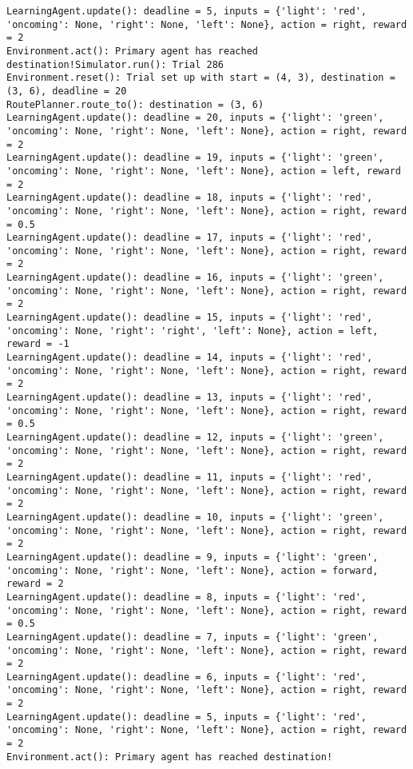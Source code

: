 \documentclass{article}
\begin{document}
\begin{verbatim}
LearningAgent.update(): deadline = 5, inputs = {'light': 'red', 'oncoming': None, 'right': None, 'left': None}, action = right, reward = 2
Environment.act(): Primary agent has reached destination!Simulator.run(): Trial 286
Environment.reset(): Trial set up with start = (4, 3), destination = (3, 6), deadline = 20
RoutePlanner.route_to(): destination = (3, 6)
LearningAgent.update(): deadline = 20, inputs = {'light': 'green', 'oncoming': None, 'right': None, 'left': None}, action = right, reward = 2
LearningAgent.update(): deadline = 19, inputs = {'light': 'green', 'oncoming': None, 'right': None, 'left': None}, action = left, reward = 2
LearningAgent.update(): deadline = 18, inputs = {'light': 'red', 'oncoming': None, 'right': None, 'left': None}, action = right, reward = 0.5
LearningAgent.update(): deadline = 17, inputs = {'light': 'red', 'oncoming': None, 'right': None, 'left': None}, action = right, reward = 2
LearningAgent.update(): deadline = 16, inputs = {'light': 'green', 'oncoming': None, 'right': None, 'left': None}, action = right, reward = 2
LearningAgent.update(): deadline = 15, inputs = {'light': 'red', 'oncoming': None, 'right': 'right', 'left': None}, action = left, reward = -1
LearningAgent.update(): deadline = 14, inputs = {'light': 'red', 'oncoming': None, 'right': None, 'left': None}, action = right, reward = 2
LearningAgent.update(): deadline = 13, inputs = {'light': 'red', 'oncoming': None, 'right': None, 'left': None}, action = right, reward = 0.5
LearningAgent.update(): deadline = 12, inputs = {'light': 'green', 'oncoming': None, 'right': None, 'left': None}, action = right, reward = 2
LearningAgent.update(): deadline = 11, inputs = {'light': 'red', 'oncoming': None, 'right': None, 'left': None}, action = right, reward = 2
LearningAgent.update(): deadline = 10, inputs = {'light': 'green', 'oncoming': None, 'right': None, 'left': None}, action = right, reward = 2
LearningAgent.update(): deadline = 9, inputs = {'light': 'green', 'oncoming': None, 'right': None, 'left': None}, action = forward, reward = 2
LearningAgent.update(): deadline = 8, inputs = {'light': 'red', 'oncoming': None, 'right': None, 'left': None}, action = right, reward = 0.5
LearningAgent.update(): deadline = 7, inputs = {'light': 'green', 'oncoming': None, 'right': None, 'left': None}, action = right, reward = 2
LearningAgent.update(): deadline = 6, inputs = {'light': 'red', 'oncoming': None, 'right': None, 'left': None}, action = right, reward = 2
LearningAgent.update(): deadline = 5, inputs = {'light': 'red', 'oncoming': None, 'right': None, 'left': None}, action = right, reward = 2
Environment.act(): Primary agent has reached destination!
\end{verbatim}
\end{document}
